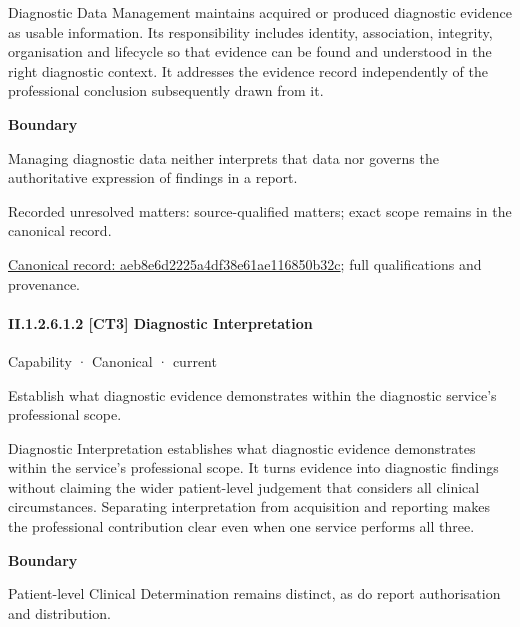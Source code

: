 Diagnostic Data Management maintains acquired or produced diagnostic evidence as usable information. Its responsibility includes identity, association, integrity, organisation and lifecycle so that evidence can be found and understood in the right diagnostic context. It addresses the evidence record independently of the professional conclusion subsequently drawn from it.



\textbf{Boundary}



Managing diagnostic data neither interprets that data nor governs the authoritative expression of findings in a report.


{\small Recorded unresolved matters: source-qualified matters; exact scope remains in the canonical record.}\par
{\footnotesize \href{../../../../../../../continuum/strategy/capability/aeb8e6d2225a4df38e61ae116850b32c.md}{Canonical record: aeb8e6d2225a4df38e61ae116850b32c}; full qualifications and provenance.}\par
\paragraph*{II.1.2.6.1.2 [CT3] Diagnostic Interpretation}
\label{navigation:II.1.2.6.1.2}

\label{element:82ad867109f1438eb1b0916ed9cd820f}
{\small Capability · Canonical · current}\par

Establish what diagnostic evidence demonstrates within the diagnostic service’s professional scope.



Diagnostic Interpretation establishes what diagnostic evidence demonstrates within the service's professional scope. It turns evidence into diagnostic findings without claiming the wider patient-level judgement that considers all clinical circumstances. Separating interpretation from acquisition and reporting makes the professional contribution clear even when one service performs all three.



\textbf{Boundary}



Patient-level Clinical Determination remains distinct, as do report authorisation and distribution.


